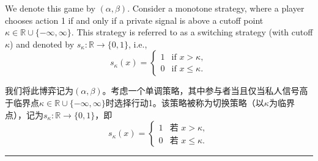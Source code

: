 \documentclass[12pt,a4paper]{article}
\newenvironment{original}
  {\par\medskip\noindent\color{black}\ignorespaces}
  {\par\medskip}
\newenvironment{translation}
  {\par\noindent\color{darkblue}\ignorespaces}
  {\par\medskip\noindent\hrule\par\medskip}
\theoremstyle{definition}
\theoremstyle{remark}
\begin{document}
\begin{original}
We denote this game by $(\alpha, \beta)$. Consider a monotone strategy, where a player chooses action 1 if and only if a private signal is above a cutoff point $\kappa \in \mathbb{R} \cup \{-\infty, \infty\}$. This strategy is referred to as a switching strategy (with cutoff $\kappa$) and denoted by $s_\kappa \colon \mathbb{R} \to \{0, 1\}$, i.e.,
\[
s_\kappa(x) =
\begin{cases}
1 & \text{if } x > \kappa,\\
0 & \text{if } x \le \kappa.
\end{cases}
\tag{1}
\]
\end{original}
\begin{translation}
我们将此博弈记为$(\alpha, \beta)$。考虑一个单调策略，其中参与者当且仅当私人信号高于临界点$\kappa \in \mathbb{R} \cup \{-\infty, \infty\}$时选择行动1。该策略被称为切换策略（以$\kappa$为临界点），记为$s_\kappa \colon \mathbb{R} \to \{0, 1\}$，即
\[
s_\kappa(x) =
\begin{cases}
1 & \text{若 } x > \kappa,\\
0 & \text{若 } x \le \kappa.
\end{cases}
\tag{1}
\]
\end{translation}
\end{document}
